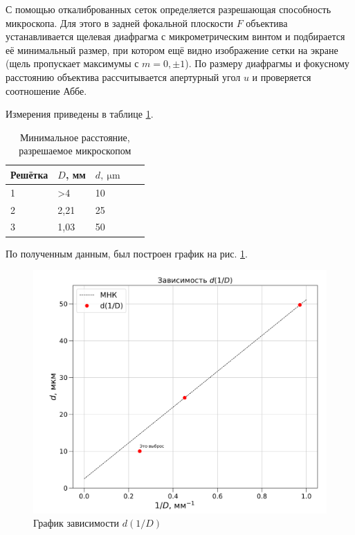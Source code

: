 \documentclass[12pt, a4paper]{article}
\begin{document}
С помощью откалиброванных сеток определяется разрешающая способность
микроскопа. Для этого в задней фокальной плоскости $F$ объектива
устанавливается щелевая диафрагма с микрометрическим винтом и подбирается её
минимальный размер, при котором ещё видно изображение сетки на экране (щель
пропускает максимумы с $m = 0, \pm 1$). По размеру диафрагмы и фокусному
расстоянию объектива рассчитывается апертурный угол $u$ и проверяется
соотношение Аббе.

Измерения приведены в таблице \ref{tab:micro}.

\begin{table}[H]
    \centering
    \begin{tabular}{|p{2cm}|p{2cm}|p{2cm}|p{2cm}|p{2cm}|}
        \hline Решётка & $D$, мм & $d,~\mathrm{\mu m}$ \\ \hline
        1              & >4      & 10                  \\ \hline
        2              & 2,21    & 25                  \\ \hline
        3              & 1,03    & 50                  \\ \hline
    \end{tabular}
    \caption{Минимальное расстояние, разрешаемое микроскопом}
    \label{tab:micro}
\end{table}

По полученным данным, был построен график на рис. \ref{gr}.

\begin{figure}[H]
    \centering
    \includegraphics[scale=0.65]{pics/plot.png}
    \caption{График зависимости $d(1/D)$}
    \label{gr}
\end{figure}
\end{document}
